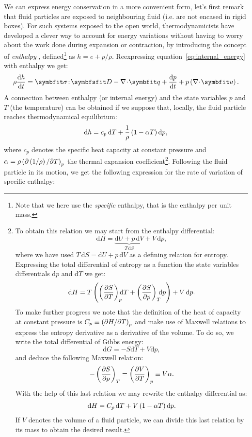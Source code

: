 We can express energy conservation in a more convenient form, let's first remark that fluid particles are exposed to neighbouring fluid (i.e. are not encased in rigid boxes). For such systems exposed to the open world, thermodynamicists have developed a clever way to account for energy variations without having to worry about the work done during expansion or contraction, by introducing the concept of \textit{enthalpy} \citep{Atkins2010}, defined\footnote{Note that we here use the \textit{specific} enthalpy, that is the enthalpy per unit mass.} as $h = e + p/\rho$.
Reexpressing equation~\eqref{eq:internal_energy} with enthalpy we get:
\begin{equation}
\rho\dd{h}{t}  = \symbfit\sigma \!:\! \symbfsfit D  - \nabla\!\cdot\!\bq + \dd{p}{t} + p \lp\nabla\!\cdot\!\bu\rp.
\label{eq:enthalpy}
\end{equation}
A connection between enthalpy (or internal energy) and the state variables $p$ and $T$ (the temperature) can be obtained if we suppose that, locally, the fluid particle reaches thermodynamical equilibrium:
\begin{equation}
\mathrm dh = c_p\, \mathrm dT + \frac{1}{\rho}\left( 1 - \alpha T\right) \mathrm dp,
\end{equation}
where $c_p$ denotes the specific heat capacity at constant pressure and $\alpha = \rho \left( \partial \left( 1/\rho\right) / \partial T\right)_p$ the thermal expansion coefficient\footnote{
To obtain this relation we may start from the enthalpy differential:
$$
\mathrm dH = \underbrace{\mathrm dU + p\,\mathrm dV}_{T\,\mathrm dS} + V\, \mathrm dp,
$$
where we have used $T\,\mathrm dS = \mathrm dU + p\,\mathrm dV$ as a defining relation for entropy. Expressing the total differential of entropy as a function the state variables differentials $\mathrm dp$ and $\mathrm dT$ we get:
$$
\mathrm dH = T\left( \left(\frac{\partial S}{\partial T}\right)_p\!\!\!\mathrm dT + \left(\frac{\partial S}{\partial p}\right)_T\!\!\!\mathrm dp\right) + V\, \mathrm dp.
$$
To make further progress we note that the definition of the heat of capacity at constant pressure is $C_p\equiv\left(\partial H/\partial T\right)_p$ and make use of Maxwell relations to express the entropy derivative as a derivative of the volume. To do so, we write the total differential of Gibbs energy:
$$
\mathrm dG = -S\mathrm dT + V \mathrm dp,
$$
and deduce the following Maxwell relation:
$$
-\left(\frac{\partial S}{\partial p}\right)_T = \left(\frac{\partial V}{\partial T}\right)_p \equiv V\alpha.
$$
With the help of this last relation we may rewrite the enthalpy differential as:
$$
\mathrm dH = C_p\,\mathrm dT + V\left( 1 - \alpha T\right) \mathrm dp.
$$
If $V$ denotes the volume of a fluid particle, we can divide this last relation by its mass to obtain the desired result.
}. Following the fluid particle in its motion, we get the following expression for the rate of variation of specific enthalpy:
